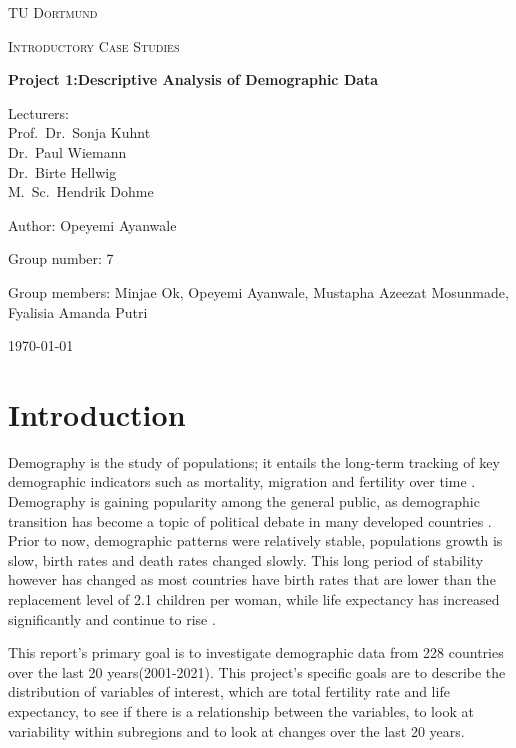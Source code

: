 \documentclass[12 pt]{scrartcl}
\begin{document}
\begin{titlepage}
	\centering
	{\scshape\LARGE TU Dortmund \par}
	\vspace{1cm}
	{\scshape\Large Introductory Case Studies \par}
	\vspace{2cm}
	{\huge\bfseries Project {1}:{Descriptive Analysis of Demographic Data }\par}
	\vspace{2cm}
	{\Large Lecturers:\\
		Prof.\ Dr.\ Sonja Kuhnt\\
		Dr.\ Paul Wiemann\\
		Dr.\ Birte Hellwig\\
		M.\ Sc.\ Hendrik Dohme \par}
	\vspace{1cm}
	{\Large Author: {Opeyemi Ayanwale} \par}
	\vspace{0.5 cm}
	{\Large Group number: {7}\par}
	\vspace{0.5 cm}
	{\Large Group members: {Minjae Ok, Opeyemi Ayanwale, Mustapha Azeezat Mosunmade, Fyalisia Amanda Putri}}
	\vfill
	{\large \today\par}
\end{titlepage}


\tableofcontents
\thispagestyle{empty}

\cleardoublepage

\setcounter{page}{1}
\section{Introduction}

Demography is the study of populations; it entails the long-term tracking of key demographic indicators such as mortality, migration and fertility over time \citep{MPIDR}. Demography is gaining popularity among the general public, as demographic transition has become a topic of political debate in many developed countries  \citep{MPIDR}. Prior to now, demographic patterns were relatively stable, populations growth is slow, birth rates and death rates changed slowly. This long period of stability however has changed as most countries have birth rates that are lower than the replacement level of 2.1 children per woman, while life expectancy has increased significantly and continue to rise \citep{MPIDR, owidfertilityrate}. 

This report's primary goal is to investigate demographic data from 228 countries over the last 20 years(2001-2021). This project's specific goals are to describe the distribution of variables of interest, which are total fertility rate and life expectancy, to see if there is a relationship between the variables, to look at variability within subregions and to look at changes over the last 20 years.
\end{document}

